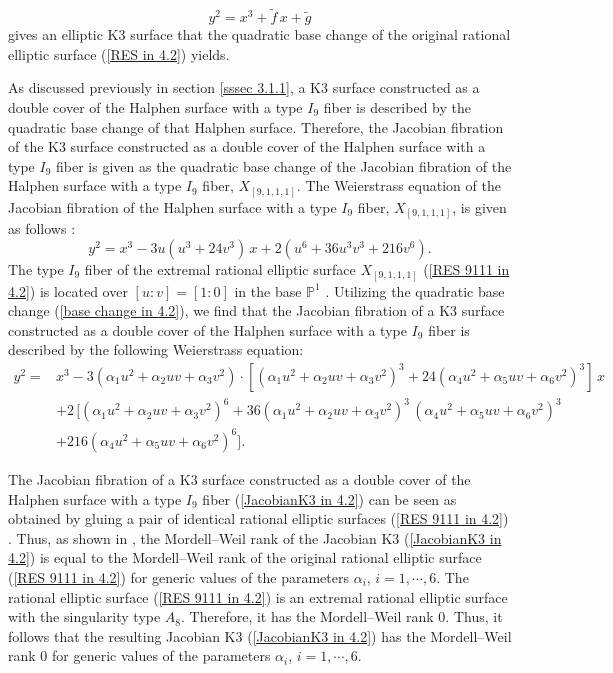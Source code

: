 \documentclass[12pt]{article}
\def\P{\mathbb{P}}
\def\til{\tilde}
\begin{document}
\begin{equation}
y^2=x^3+\til{f}\, x+\til{g}
\end{equation}
gives an elliptic K3 surface that the quadratic base change of the original rational elliptic surface (\ref{RES in 4.2}) yields. 
\par As discussed previously in section \ref{sssec 3.1.1}, a K3 surface constructed as a double cover of the Halphen surface with a type $I_9$ fiber is described by the quadratic base change of that Halphen surface. Therefore, the Jacobian fibration of the K3 surface constructed as a double cover of the Halphen surface with a type $I_9$ fiber is given as the quadratic base change of the Jacobian fibration of the Halphen surface with a type $I_9$ fiber, $X_{[9, 1, 1, 1]}$. The Weierstrass equation of the Jacobian fibration of the Halphen surface with a type $I_9$ fiber, $X_{[9, 1, 1, 1]}$, is given as follows \cite{MP}:
\begin{equation}
\label{RES 9111 in 4.2}
y^2=x^3-3u(u^3+24v^3)\, x+2(u^6+36u^3v^3+216v^6).
\end{equation}
The type $I_9$ fiber of the extremal rational elliptic surface $X_{[9, 1, 1, 1]}$ (\ref{RES 9111 in 4.2}) is located over $[u:v]=[1:0]$ in the base $\P^1$ \cite{MP}. Utilizing the quadratic base change (\ref{base change in 4.2}), we find that the Jacobian fibration of a K3 surface constructed as a double cover of the Halphen surface with a type $I_9$ fiber is described by the following Weierstrass equation:
\begin{equation}
\label{JacobianK3 in 4.2}
\begin{split}
y^2= & x^3-3(\alpha_1 u^2 +\alpha_2 uv + \alpha_3 v^2)\cdot [( \alpha_1 u^2 +\alpha_2 uv + \alpha_3 v^2)^3+24(\alpha_4 u^2 +\alpha_5 uv + \alpha_6 v^2)^3]\, x \\
& +2\, [(\alpha_1 u^2 +\alpha_2 uv + \alpha_3 v^2)^6+36(\alpha_1 u^2 +\alpha_2 uv + \alpha_3 v^2)^3\, (\alpha_4 u^2 +\alpha_5 uv + \alpha_6 v^2)^3 \\
& +216(\alpha_4 u^2 +\alpha_5 uv + \alpha_6 v^2)^6].
\end{split}
\end{equation}
\par The Jacobian fibration of a K3 surface constructed as a double cover of the Halphen surface with a type $I_9$ fiber (\ref{JacobianK3 in 4.2}) can be seen as obtained by gluing a pair of identical rational elliptic surfaces (\ref{RES 9111 in 4.2}) \cite{Kimura1710}. Thus, as shown in \cite{Kimura1802}, the Mordell--Weil rank of the Jacobian K3 (\ref{JacobianK3 in 4.2}) is equal to the Mordell--Weil rank of the original rational elliptic surface (\ref{RES 9111 in 4.2}) for generic values of the parameters $\alpha_i$, $i=1, \cdots, 6$. The rational elliptic surface (\ref{RES 9111 in 4.2}) is an extremal rational elliptic surface with the singularity type $A_8$. Therefore, it has the Mordell--Weil rank 0. Thus, it follows that the resulting Jacobian K3 (\ref{JacobianK3 in 4.2}) has the Mordell--Weil rank 0 for generic values of the parameters $\alpha_i$, $i=1, \cdots, 6$. 
\end{document}
